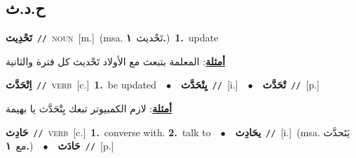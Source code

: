 \documentclass[10pt,a4paper,twoside]{article} %
\begin{document}
\begin{multicols}{2}
{{{{{{{{{{{{{{\vspace{-3mm}
\subsection*{\color{blue}\foreignlanguage{arabic}{ح.د.ث}\color{blue}{}} 

{\setlength\topsep{0pt}\textbf{\foreignlanguage{arabic}{تَحْدِيث}}\ {\color{gray}\texttt{//}\color{black}}\ \textsc{noun}\ [m.]\ \color{gray}(msa. \foreignlanguage{arabic}{تَحْديث}~\foreignlanguage{arabic}{\textbf{١.}})\color{black}\ \textbf{1.}~update\  \begin{flushright}\color{gray}\foreignlanguage{arabic}{\textbf{\underline{\foreignlanguage{arabic}{أمثلة}}}: المعلمة بتبعث مع الأولاد تَحْديث كل فترة والثانية}\end{flushright}\color{black}} \vspace{2mm}

{\setlength\topsep{0pt}\textbf{\foreignlanguage{arabic}{اِتْحَدَّث}}\ {\color{gray}\texttt{//}\color{black}}\ \textsc{verb}\ [c.]\ \textbf{1.}~be updated\ \ $\bullet$\ \ \setlength\topsep{0pt}\textbf{\foreignlanguage{arabic}{يِتْحَدَّث}}\ {\color{gray}\texttt{//}\color{black}}\ [i.]\ \ $\bullet$\ \ \setlength\topsep{0pt}\textbf{\foreignlanguage{arabic}{تْحَدَّث}}\ {\color{gray}\texttt{//}\color{black}}\ [p.]\  \begin{flushright}\color{gray}\foreignlanguage{arabic}{\textbf{\underline{\foreignlanguage{arabic}{أمثلة}}}: لازم الكمبيوتر تبعك يِتْحَدَّث يا بهيمة}\end{flushright}\color{black}} \vspace{2mm}

{\setlength\topsep{0pt}\textbf{\foreignlanguage{arabic}{حَادِث}}\ {\color{gray}\texttt{//}\color{black}}\ \textsc{verb}\ [c.]\ \textbf{1.}~converse with.  \textbf{2.}~talk to\ \ $\bullet$\ \ \setlength\topsep{0pt}\textbf{\foreignlanguage{arabic}{يحَادِث}}\ {\color{gray}\texttt{//}\color{black}}\ [i.]\ \color{gray}(msa. \foreignlanguage{arabic}{يَتَحدَّث مع}~\foreignlanguage{arabic}{\textbf{١.}})\color{black}\ \ $\bullet$\ \ \setlength\topsep{0pt}\textbf{\foreignlanguage{arabic}{حَادَث}}\ {\color{gray}\texttt{//}\color{black}}\ [p.]\ 

}}}}}}}}}}}}}}}
\end{multicols}
\end{document}
